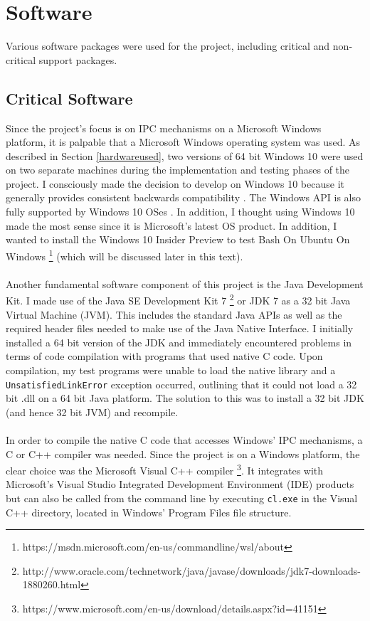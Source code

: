 \documentclass[12pt] {newrucsthesis}    %
\def\code#1{\texttt{#1}}
\begin{document}
    \section{Software} \label{softwareused}%
      Various software packages were used for the project, including critical and
      non-critical support packages.
        \subsection{Critical Software}
          Since the project's focus is on IPC mechanisms on a Microsoft Windows
          platform, it is palpable that a Microsoft Windows operating system was used. As described in
          Section \ref{hardwareused}, two versions of 64 bit Windows 10 were used on two separate
          machines during the implementation and testing phases of the project. I consciously made
          the decision to develop on Windows 10 because it generally provides
          consistent backwards compatibility \citep{win10BC}. The Windows API is also fully supported
          by Windows 10 OSes \citep{MSDN_API}. In addition, I thought using Windows 10 made the most sense
          since it is Microsoft's latest OS product. In addition, I wanted to install the Windows 10 Insider Preview
          to test Bash On Ubuntu On Windows \footnote{https://msdn.microsoft.com/en-us/commandline/wsl/about} (which will be discussed later in this text).
          \\\\
          Another fundamental software component of this project is the Java Development Kit. I made
          use of the Java SE Development Kit 7 \footnote{http://www.oracle.com/technetwork/java/javase/downloads/jdk7-downloads-1880260.html} or JDK 7 as a 32 bit Java Virtual Machine (JVM).
          This includes the standard Java APIs as well as the required header files needed to
          make use of the Java Native Interface. I initially installed a 64 bit version of the JDK and
          immediately encountered problems in terms of code compilation with programs that used native
          C code. Upon compilation, my test programs were unable to load the native library and a
          \code{UnsatisfiedLinkError} exception occurred, outlining that it could not load a 32 bit .dll
          on a 64 bit Java platform. The solution to this was to install a 32 bit JDK (and hence 32 bit
          JVM) and recompile.
          \\\\
          In order to compile the native C code that accesses Windows' IPC mechanisms, a C or C++
          compiler was needed. Since the project is on a Windows platform, the clear choice was the
          Microsoft Visual C++ compiler \footnote{https://www.microsoft.com/en-us/download/details.aspx?id=41151}.
          It integrates with Microsoft's Visual Studio Integrated
          Development Environment (IDE) products but can also be called from the command line by
          executing \code{cl.exe} in the Visual C++ directory, located in Windows' Program Files file structure.
\end{document}
